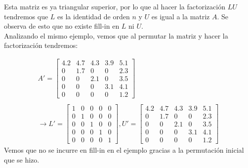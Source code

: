 \documentclass{article}
\begin{document}
\begin{enumerate}
Esta matriz es ya triangular superior, por lo que al hacer la factorizaci\'on $LU$ tendremos que $L$ es la identidad de orden $n$ y $U$ es igual a la matriz $A$. Se observa de esto que no existe fill-in en $L$ ni $U$.
\\ 
Analizando el mismo ejemplo, vemos que al permutar la matriz y hacer la factorizaci\'on tendremos:

\begin{gather*}
A' =
\begin{bmatrix}
   4.2  &   4.7   &  4.3 &  3.9 & 5.1 \\
    0   &   1.7   &  0   &  0   & 2.3 \\
    0   &    0    &  2.1 &  0   & 3.5 \\
    0   &    0    &  0   &  3.1 & 4.1 \\
    0   &    0    &  0   &  0   & 1.2
\end{bmatrix}\\\\
\rightarrow
L' = 
\begin{bmatrix}
       1   &     0    &     0  &    0   &  0 \\
       0   &     1    &     0  &    0   &  0 \\
       0   &     0    &     1  &    0   &  0 \\
       0   &     0    &     0  &    1   &  0 \\
       0   &     0    &  	0  &    0   &  1
\end{bmatrix},
U' = 
\begin{bmatrix}
   4.2  &   4.7   &  4.3 &  3.9 & 5.1 \\
    0   &   1.7   &  0   &  0   & 2.3 \\
    0   &    0    &  2.1 &  0   & 3.5 \\
    0   &    0    &  0   &  3.1 & 4.1 \\
    0   &    0    &  0   &  0   & 1.2
\end{bmatrix}
\end{gather*}
Vemos que no se incurre en fill-in en el ejemplo gracias a la permutaci\'on inicial que se hizo.



\end{enumerate}
\end{document}
